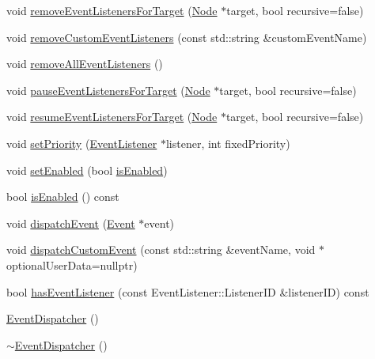 \begin{DoxyCompactItemize}
\item 
void \hyperlink{classEventDispatcher_a64446315eca1c938c541d35d35d1a2a4}{remove\+Event\+Listeners\+For\+Target} (\hyperlink{classNode}{Node} $\ast$target, bool recursive=false)
\item 
void \hyperlink{classEventDispatcher_a255daae22df2d99e4209a43c3473f409}{remove\+Custom\+Event\+Listeners} (const std\+::string \&custom\+Event\+Name)
\item 
void \hyperlink{classEventDispatcher_aa7bba43c3e78f0957937d985fe13e0fe}{remove\+All\+Event\+Listeners} ()
\item 
void \hyperlink{classEventDispatcher_a33dbf3057a30a92f741fd1465b70363f}{pause\+Event\+Listeners\+For\+Target} (\hyperlink{classNode}{Node} $\ast$target, bool recursive=false)
\item 
void \hyperlink{classEventDispatcher_af38aed6f3a7890dc03f214dbaf49faf6}{resume\+Event\+Listeners\+For\+Target} (\hyperlink{classNode}{Node} $\ast$target, bool recursive=false)
\item 
void \hyperlink{classEventDispatcher_a8368f3f3945977b5a5c3d0cc75f90cd5}{set\+Priority} (\hyperlink{classEventListener}{Event\+Listener} $\ast$listener, int fixed\+Priority)
\item 
void \hyperlink{classEventDispatcher_a1fc28fe8361af5b2a2fb9b108d89da42}{set\+Enabled} (bool \hyperlink{classEventDispatcher_a5350c4316fd57701602cb7d9f5fb8535}{is\+Enabled})
\item 
bool \hyperlink{classEventDispatcher_a5350c4316fd57701602cb7d9f5fb8535}{is\+Enabled} () const
\item 
void \hyperlink{classEventDispatcher_ac6358a032a83c7b1bc3df9beb8f753fe}{dispatch\+Event} (\hyperlink{classEvent}{Event} $\ast$event)
\item 
void \hyperlink{classEventDispatcher_aca6dac5b1a5363409c51331bc3142bea}{dispatch\+Custom\+Event} (const std\+::string \&event\+Name, void $\ast$optional\+User\+Data=nullptr)
\item 
bool \hyperlink{classEventDispatcher_a22e17868087e7162f7d59559f2122308}{has\+Event\+Listener} (const Event\+Listener\+::\+Listener\+ID \&listener\+ID) const
\item 
\hyperlink{classEventDispatcher_aec174a9e25796e5727e59f5452817cda}{Event\+Dispatcher} ()
\item 
\hyperlink{classEventDispatcher_abb5f401014e87f03027d6c4450964e55}{$\sim$\+Event\+Dispatcher} ()
\end{DoxyCompactItemize}
